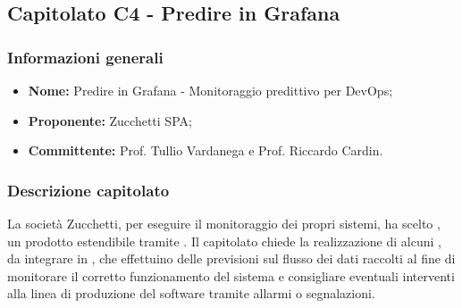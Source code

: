 
\subsection{Capitolato C4 - Predire in Grafana}

		\subsubsection{Informazioni generali}
			\begin{itemize} %
			  \item \textbf{Nome:} Predire in Grafana - Monitoraggio predittivo per DevOps;
			  \item \textbf{Proponente:} Zucchetti SPA;
				\item \textbf{Committente: }Prof. Tullio Vardanega e Prof. Riccardo Cardin.
			\end{itemize}

		\subsubsection{Descrizione capitolato}
			La società Zucchetti, per eseguire il monitoraggio dei propri sistemi, ha scelto , un prodotto  estendibile tramite .
			Il capitolato chiede la realizzazione di alcuni , da integrare in , che effettuino delle previsioni sul flusso dei dati raccolti al fine di monitorare il corretto funzionamento del sistema e consigliare eventuali interventi alla linea di produzione del software tramite allarmi o segnalazioni.

